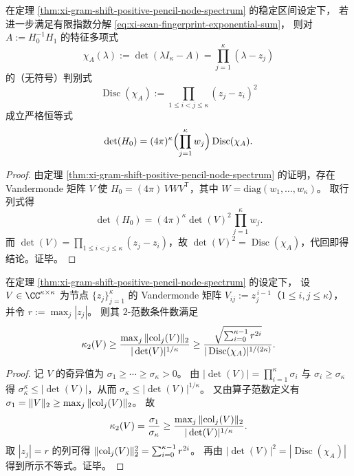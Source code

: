 \begin{theorem}\label{thm:xi-hankel-determinant-gramshift-discriminant-identity}
在定理 \ref{thm:xi-gram-shift-positive-pencil-node-spectrum} 的稳定区间设定下，
若进一步满足有限指数分解 \eqref{eq:xi-scan-fingerprint-exponential-sum}，
则对 \(A:=H_0^{-1}H_1\) 的特征多项式
\[
\chi_A(\lambda):=\det(\lambda I_\kappa-A)=\prod_{j=1}^{\kappa}(\lambda-z_j)
\]
的（无符号）判别式
\[
\operatorname{Disc}(\chi_A):=\prod_{1\le i<j\le \kappa}(z_j-z_i)^2
\]
成立严格恒等式
\[
\det(H_0)
=(4\pi)^{\kappa}\Bigl(\prod_{j=1}^{\kappa} w_j\Bigr)\operatorname{Disc}(\chi_A).
\]
\end{theorem}
\begin{proof}
由定理 \ref{thm:xi-gram-shift-positive-pencil-node-spectrum} 的证明，存在 Vandermonde 矩阵 \(V\) 使
\(
H_0=(4\pi)\,V W V^{\mathsf T}
\)，其中 \(W=\mathrm{diag}(w_1,\dots,w_\kappa)\)。
取行列式得
\[
\det(H_0)=(4\pi)^\kappa\det(V)^2\prod_{j=1}^{\kappa}w_j.
\]
而 \(\det(V)=\prod_{1\le i<j\le\kappa}(z_j-z_i)\)，故 \(\det(V)^2=\operatorname{Disc}(\chi_A)\)，代回即得结论。证毕。
\end{proof}

\begin{proposition}\label{prop:xi-vandermonde-conditioning-lower-bound-disc}
在定理 \ref{thm:xi-gram-shift-positive-pencil-node-spectrum} 的设定下，
设 \(V\in\CC^{\kappa\times\kappa}\) 为节点 \(\{z_j\}_{j=1}^{\kappa}\) 的 Vandermonde 矩阵
\(
V_{ij}:=z_j^{\,i-1}
\)（\(1\le i,j\le \kappa\)），并令 \(r:=\max_j|z_j|\)。
则其 \(2\)-范数条件数满足
\[
\kappa_2(V)
\ge \frac{\max_j\|{\rm col}_j(V)\|_2}{|\det(V)|^{1/\kappa}}
\ge \frac{\sqrt{\sum_{i=0}^{\kappa-1}r^{2i}}}{|\operatorname{Disc}(\chi_A)|^{1/(2\kappa)}}.
\]
\end{proposition}
\begin{proof}
记 \(V\) 的奇异值为 \(\sigma_1\ge\cdots\ge\sigma_\kappa>0\)。
由 \(|\det(V)|=\prod_{i=1}^{\kappa}\sigma_i\) 与 \(\sigma_i\ge \sigma_\kappa\) 得
\(
\sigma_\kappa^\kappa\le |\det(V)|
\)，从而 \(\sigma_\kappa\le |\det(V)|^{1/\kappa}\)。
又由算子范数定义有 \(\sigma_1=\|V\|_2\ge \max_j\|{\rm col}_j(V)\|_2\)。
故
\[
\kappa_2(V)=\frac{\sigma_1}{\sigma_\kappa}\ge \frac{\max_j\|{\rm col}_j(V)\|_2}{|\det(V)|^{1/\kappa}}.
\]
取 \(|z_j|=r\) 的列可得 \(\|{\rm col}_j(V)\|_2^2=\sum_{i=0}^{\kappa-1}r^{2i}\)。
再由 \(|\det(V)|^2=|\operatorname{Disc}(\chi_A)|\) 得到所示不等式。证毕。
\end{proof}

